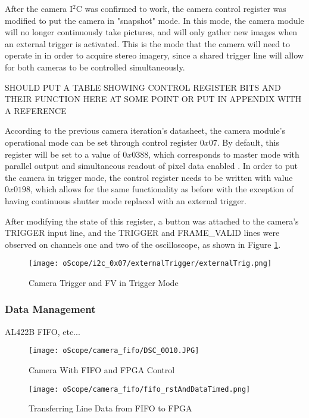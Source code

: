 \par
After the camera I$^2$C was confirmed to work, the camera control register was modified to put the camera in "snapshot" mode. In this mode, the camera module will no longer continuously take pictures, and will only gather new images when an external trigger is activated. This is the mode that the camera will need to operate in in order to acquire stereo imagery, since a shared trigger line will allow for both cameras to be controlled simultaneously. 
\par
SHOULD PUT A TABLE SHOWING CONTROL REGISTER BITS AND THEIR FUNCTION HERE AT SOME POINT OR PUT IN APPENDIX WITH A REFERENCE
\par
According to the previous camera iteration's datasheet, the camera module's operational mode can be set through control register $0x07$. By default, this register will be set to a value of $0x0388$, which corresponds to master mode with parallel output and simultaneous readout of pixel data enabled \cite{mt9v032}. In order to put the camera in trigger mode, the control register needs to be written with value $0x0198$, which allows for the same functionality as before with the exception of having continuous shutter mode replaced with an external trigger. 
\par
After modifying the state of this register, a button was attached to the camera's TRIGGER input line, and the TRIGGER and FRAME\_VALID lines were observed on channels one and two of the oscilloscope, as shown in Figure \ref{camInTrigMode}.
\begin{figure}[H]
	\centerline{\texttt{[image: oScope/i2c\_0x07/externalTrigger/externalTrig.png]}}
	\caption{Camera Trigger and FV in Trigger Mode}
	\label{camInTrigMode}
\end{figure}


\subsubsection{Data Management}
AL422B FIFO, etc...

\begin{figure}[H]
	\centerline{\texttt{[image: oScope/camera\_fifo/DSC\_0010.JPG]}}
	\caption{Camera With FIFO and FPGA Control}
	\label{cameraTestSetup}
\end{figure}

\begin{figure}[H]
	\centerline{\texttt{[image: oScope/camera\_fifo/fifo\_rstAndDataTimed.png]}}
	\caption{Transferring Line Data from FIFO to FPGA}
	\label{fifoDataOut}
\end{figure}

